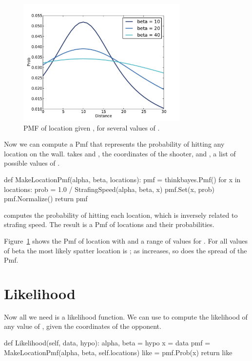 \documentclass[12pt]{book}
\theoremstyle{exercise}
\begin{document}
\begin{figure}
\centerline{\includegraphics[height=2.5in]{figs/paintball1.pdf}}
\caption{PMF of location given , for several values of
  .}
\label{fig.paintball1}
\end{figure}

Now we can compute a Pmf that represents the probability of hitting
any location on the wall.   takes  and
, the coordinates of the shooter, and , a
list of possible values of .

\begin{code}
def MakeLocationPmf(alpha, beta, locations):
    pmf = thinkbayes.Pmf()
    for x in locations:
        prob = 1.0 / StrafingSpeed(alpha, beta, x)
        pmf.Set(x, prob)
    pmf.Normalize()
    return pmf
\end{code}

 computes the probability of hitting
each location, which is inversely related to
strafing speed.  The result is a Pmf of locations and their
probabilities.

Figure~\ref{fig.paintball1} shows the Pmf of location with  and a range of values for .  For all values of beta
the most likely spatter location is ; as 
increases, so does the spread of the Pmf.



\section{Likelihood}

Now all we need is a likelihood function.
We can use  to compute the likelihood
of any value of , given the coordinates of the opponent.

\begin{code}
    def Likelihood(self, data, hypo):
        alpha, beta = hypo
        x = data
        pmf = MakeLocationPmf(alpha, beta, self.locations)
        like = pmf.Prob(x)
        return like
\end{code}
\end{document}
